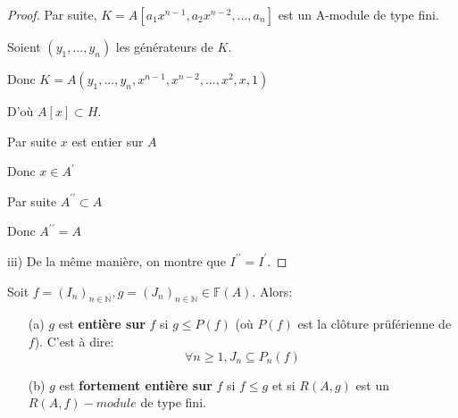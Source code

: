 \begin{proof}
	Par suite, $K=A[a_{1}x^{n-1},a_{2}x^{n-2},...,a_{n}]$ est un A-module de
	type fini.
	
	Soient $(y_{1},...,y_{n})$ les générateurs de $K.$
	
	Donc $K=A(y_{1},...,y_{n},x^{n-1},x^{n-2},...,x^{2},x,1)$
	
	D'où $A[x]\subset H.$
	
	Par suite $x$ est entier sur $A$
	
	Donc $x\in A^{\prime }$
	
	Par suite $A^{\prime \prime }\subset A$
	
	Donc  $A^{\prime \prime }=A$
	
	iii) De la m\^{e}me manière, on montre que $I^{\prime \prime }=I^{\prime
	}.$
\end{proof}
\begin{madefinition}
	Soit $f=(I_n)_{n \in \mathbb{N}} , g = (J_n)_{n \in \mathbb{N}}\in \mathbb{F}(A)$.  Alors:\\
	\begin{enumerate}
		\item[(a)]$g$ est \textbf{entière sur} $f$ si $g \leqslant P(f)$ (où $P(f)$ est la clôture prüférienne de $f$). C'est à dire:
		\[\forall n \geqslant 1, J_n \subseteq P_{n}(f) \]
		\item[(b)]$g$ est \textbf{fortement entière sur} $f$ si $f \leqslant g$ et si $R(A,g)$ est un $R(A,f)-module$ de type fini.
	\end{enumerate}
\end{madefinition}

